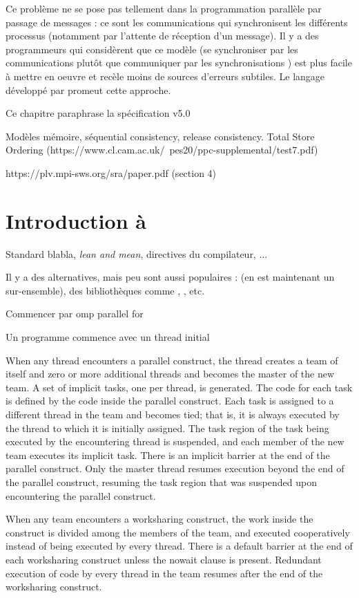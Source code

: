 Ce problème ne se pose pas tellement dans la programmation parallèle par passage
de messages : ce sont les communications qui synchronisent les différents
processus (notamment par l'attente de réception d'un message). Il y a des
programmeurs qui considèrent que ce modèle (\og se synchroniser par les
communications plutôt que communiquer par les synchronisations \fg) est plus
facile à mettre en oeuvre et recèle moins de sources d'erreurs subtiles. Le
langage  développé par  promeut cette approche.


Ce chapitre paraphrase la spécification \OMP v5.0


Modèles mémoire, séquential consistency, release consistency. Total Store
Ordering (https://www.cl.cam.ac.uk/~pes20/ppc-supplemental/test7.pdf)

https://plv.mpi-sws.org/sra/paper.pdf (section 4)

\section{Introduction à \OMP}

Standard blabla, \og \emph{lean and mean}\fg, directives du compilateur, ...

Il y a des alternatives, mais peu sont aussi populaires :  (\OMP en
est maintenant un sur-ensemble), des bibliothèques comme ,
, etc.

Commencer par omp parallel for

Un programme commence avec un thread initial

When any thread encounters a parallel construct, the thread creates a team of itself and zero or
more additional threads and becomes the master of the new team.
A set of implicit tasks, one per thread, is generated. The code for each task is
defined by the code inside the parallel construct.  Each task is assigned to a
different thread in the team and becomes tied; that is, it is always executed by
the thread to which it is initially assigned. The task region of the task being
executed by the encountering thread is suspended, and each member of the new
team executes its implicit task. There is an implicit barrier at the end of the
parallel construct. Only the master thread resumes execution beyond the end of
the parallel construct, resuming the task region that was suspended upon
encountering the parallel construct.

When any team encounters a worksharing construct, the work inside the construct is divided among
the members of the team, and executed cooperatively instead of being executed by every thread.
There is a default barrier at the end of each worksharing construct unless the nowait clause is
present. Redundant execution of code by every thread in the team resumes after the end of the
worksharing construct.

